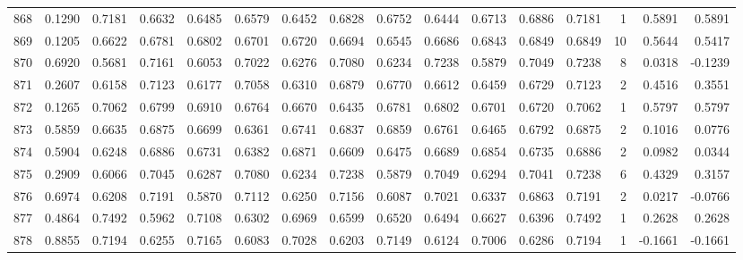 \begin{tabular}{lrrrrrrrrrrrrrrr}
868 &      0.1290 &  0.7181 &  0.6632 &  0.6485 &  0.6579 &  0.6452 &  0.6828 &  0.6752 &  0.6444 &  0.6713 &   0.6886 &     0.7181 &      1 &                    0.5891 &                     0.5891 \\
869 &      0.1205 &  0.6622 &  0.6781 &  0.6802 &  0.6701 &  0.6720 &  0.6694 &  0.6545 &  0.6686 &  0.6843 &   0.6849 &     0.6849 &     10 &                    0.5644 &                     0.5417 \\
870 &      0.6920 &  0.5681 &  0.7161 &  0.6053 &  0.7022 &  0.6276 &  0.7080 &  0.6234 &  0.7238 &  0.5879 &   0.7049 &     0.7238 &      8 &                    0.0318 &                    -0.1239 \\
871 &      0.2607 &  0.6158 &  0.7123 &  0.6177 &  0.7058 &  0.6310 &  0.6879 &  0.6770 &  0.6612 &  0.6459 &   0.6729 &     0.7123 &      2 &                    0.4516 &                     0.3551 \\
872 &      0.1265 &  0.7062 &  0.6799 &  0.6910 &  0.6764 &  0.6670 &  0.6435 &  0.6781 &  0.6802 &  0.6701 &   0.6720 &     0.7062 &      1 &                    0.5797 &                     0.5797 \\
873 &      0.5859 &  0.6635 &  0.6875 &  0.6699 &  0.6361 &  0.6741 &  0.6837 &  0.6859 &  0.6761 &  0.6465 &   0.6792 &     0.6875 &      2 &                    0.1016 &                     0.0776 \\
874 &      0.5904 &  0.6248 &  0.6886 &  0.6731 &  0.6382 &  0.6871 &  0.6609 &  0.6475 &  0.6689 &  0.6854 &   0.6735 &     0.6886 &      2 &                    0.0982 &                     0.0344 \\
875 &      0.2909 &  0.6066 &  0.7045 &  0.6287 &  0.7080 &  0.6234 &  0.7238 &  0.5879 &  0.7049 &  0.6294 &   0.7041 &     0.7238 &      6 &                    0.4329 &                     0.3157 \\
876 &      0.6974 &  0.6208 &  0.7191 &  0.5870 &  0.7112 &  0.6250 &  0.7156 &  0.6087 &  0.7021 &  0.6337 &   0.6863 &     0.7191 &      2 &                    0.0217 &                    -0.0766 \\
877 &      0.4864 &  0.7492 &  0.5962 &  0.7108 &  0.6302 &  0.6969 &  0.6599 &  0.6520 &  0.6494 &  0.6627 &   0.6396 &     0.7492 &      1 &                    0.2628 &                     0.2628 \\
878 &      0.8855 &  0.7194 &  0.6255 &  0.7165 &  0.6083 &  0.7028 &  0.6203 &  0.7149 &  0.6124 &  0.7006 &   0.6286 &     0.7194 &      1 &                   -0.1661 &                    -0.1661 \\

\end{tabular}

